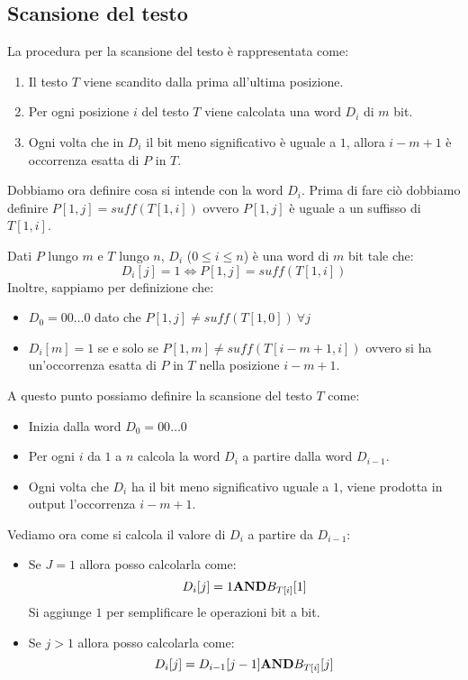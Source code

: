 \subsection{Scansione del testo}
La procedura per la scansione del testo è rappresentata come: 
\begin{enumerate}
    \item Il testo $T$ viene scandito dalla prima all'ultima posizione.
    \item Per ogni posizione $i$ del testo $T$ viene calcolata una word $D_i$ di $m$ bit.
    \item Ogni volta che in $D_i$ il bit meno significativo è uguale a $1$, allora $i - m + 1$ è occorrenza esatta di $P$ in $T$.
\end{enumerate}
Dobbiamo ora definire cosa si intende con la word $D_i$. Prima di fare ciò dobbiamo definire $P[1,j] = suff(T[1,i])$ ovvero $P[1,j]$ è uguale a un suffisso di $T[1,i]$.
\begin{definizione}
    Dati $P$ lungo $m$ e $T$ lungo $n$, $D_i$ ($0 \leq i \leq n$) è una word di $m$ bit tale che:
    \begin{equation}
        D_i[j] = 1 \iff P[1,j] = suff(T[1,i])
    \end{equation}
    Inoltre, sappiamo per definizione che:
    \begin{itemize}
        \item $D_0 = 00\dots0$ dato che $P[1, j] \neq suff(T[1, 0]) \ \forall j$
        \item $D_i[m] = 1$ se e solo se $P[1, m] \neq suff(T[i-m + 1, i])$ ovvero si ha un’occorrenza esatta di $P$ in $T$ nella posizione $i - m + 1$.
    \end{itemize}
\end{definizione}
A questo punto possiamo definire la scansione del testo $T$ come:
\begin{itemize}
    \item Inizia dalla word $D_0 = 00\dots0$
    \item Per ogni $i$ da $1$ a $n$ calcola la word $D_i$ a partire dalla word $D_{i-1}$.
    \item Ogni volta che $D_i$ ha il bit meno significativo uguale a $1$, viene prodotta in output l'occorrenza $i- m + 1$.
\end{itemize}
Vediamo ora come si calcola il valore di $D_i$ a partire da $D_{i - 1}$:
\begin{itemize}
    \item Se $J =  1$ allora posso calcolarla come:
    \begin{equation}
        D_i[j] = 1 \text{\textbf{AND}} B_{T[i]}[1]
    \end{equation}
    Si aggiunge $1$ per semplificare le operazioni bit a bit.
    \item Se $j > 1$ allora posso calcolarla come:
    \begin{equation}
        D_i[j] = D_{i - 1}[j - 1] \text{\textbf{AND}} B_{T[i]}[j]
    \end{equation}
\end{itemize}
